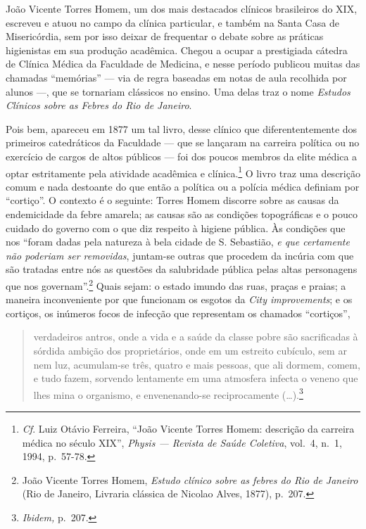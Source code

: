 João Vicente Torres Homem, um dos mais destacados clínicos brasileiros
do XIX, escreveu e atuou no campo da clínica particular, e também na
Santa Casa de Misericórdia, sem por isso deixar de frequentar o debate
sobre as práticas higienistas em sua produção acadêmica. Chegou a ocupar
a prestigiada cátedra de Clínica Médica da Faculdade de Medicina, e
nesse período publicou muitas das chamadas ``memórias'' --- via de regra
baseadas em notas de aula recolhida por alunos ---, que se tornariam
clássicos no ensino. Uma delas traz o nome \textit{Estudos Clínicos sobre
as Febres do Rio de Janeiro}.

Pois bem, apareceu em 1877 um tal livro, desse clínico que
diferententemente dos primeiros catedráticos da Faculdade --- que se
lançaram na carreira política ou no exercício de cargos de altos
públicos --- foi dos poucos membros da elite médica a optar estritamente
pela atividade acadêmica e clínica.\footnote{\textit{Cf}. Luiz Otávio
  Ferreira, ``João Vicente Torres Homem: descrição da carreira médica no
  século XIX'', \textit{Physis --- Revista de Saúde Coletiva}, vol.~4,
  n.~1, 1994, p.~57-78.} O livro traz uma descrição comum e nada
destoante do que então a política ou a polícia médica definiam por
``cortiço''. O contexto é o seguinte: Torres Homem discorre sobre as
causas da endemicidade da febre amarela; as causas são as condições
topográficas e o pouco cuidado do governo com o que diz respeito à
higiene pública. Às condições que nos ``foram dadas pela natureza à bela
cidade de S. Sebastião, \textit{e que certamente não poderiam ser
removidas}, juntam-se outras que procedem da incúria com que são
tratadas entre nós as questões da salubridade pública pelas altas
personagens que nos governam''.\footnote{João Vicente Torres Homem,
  \textit{Estudo clínico sobre as febres do Rio de Janeiro} (Rio de
  Janeiro, Livraria clássica de Nicolao Alves, 1877), p.~207.} Quais
sejam: o estado imundo das ruas, praças e praias; a maneira
inconveniente por que funcionam os esgotos da \textit{City improvements};
e os cortiços, os inúmeros focos de infecção que representam os chamados
``cortiços'',

\begin{quote}
verdadeiros antros, onde a vida e a saúde da classe pobre são
sacrificadas à sórdida ambição dos proprietários, onde em um estreito
cubículo, sem ar nem luz, acumulam-se três, quatro e mais pessoas, que
ali dormem, comem, e tudo fazem, sorvendo lentamente em uma atmosfera
infecta o veneno que lhes mina o organismo, e envenenando-se
reciprocamente (\dots{}).\footnote{\textit{Ibidem,} p.~207.}
\end{quote}


